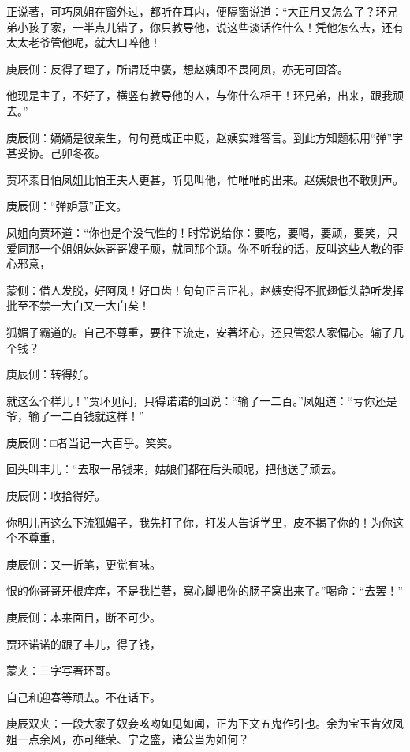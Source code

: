 \begin{parag}
    正说著，可巧凤姐在窗外过，都听在耳内，便隔窗说道：“大正月又怎么了？环兄弟小孩子家，一半点儿错了，你只教导他，说这些淡话作什么！凭他怎么去，还有太太老爷管他呢，就大口啐他！\begin{note}庚辰侧：反得了理了，所谓贬中褒，想赵姨即不畏阿凤，亦无可回答。\end{note}他现是主子，不好了，横竖有教导他的人，与你什么相干！环兄弟，出来，跟我顽去。”\begin{note}庚辰侧：嫡嫡是彼亲生，句句竟成正中贬，赵姨实难答言。到此方知题标用“弹”字甚妥协。己卯冬夜。\end{note}贾环素日怕凤姐比怕王夫人更甚，听见叫他，忙唯唯的出来。赵姨娘也不敢则声。\begin{note}庚辰侧：“弹妒意”正文。\end{note}凤姐向贾环道：“你也是个没气性的！时常说给你：要吃，要喝，要顽，要笑，只爱同那一个姐姐妹妹哥哥嫂子顽，就同那个顽。你不听我的话，反叫这些人教的歪心邪意，\begin{note}蒙侧：借人发脱，好阿凤！好口齿！句句正言正礼，赵姨安得不抿翅低头静听发挥批至不禁一大白又一大白矣！\end{note}狐媚子霸道的。自己不尊重，要往下流走，安著坏心，还只管怨人家偏心。输了几个钱？\begin{note}庚辰侧：转得好。\end{note}就这么个样儿！”贾环见问，只得诺诺的回说：“输了一二百。”凤姐道：“亏你还是爷，输了一二百钱就这样！”\begin{note}庚辰侧：□者当记一大百乎。笑笑。\end{note}回头叫丰儿：“去取一吊钱来，姑娘们都在后头顽呢，把他送了顽去。\begin{note}庚辰侧：收拾得好。\end{note}你明儿再这么下流狐媚子，我先打了你，打发人告诉学里，皮不揭了你的！为你这个不尊重，\begin{note}庚辰侧：又一折笔，更觉有味。\end{note}恨的你哥哥牙根痒痒，不是我拦著，窝心脚把你的肠子窝出来了。”喝命：“去罢！”\begin{note}庚辰侧：本来面目，断不可少。\end{note}贾环诺诺的跟了丰儿，得了钱，\begin{note}蒙夹：三字写著环哥。\end{note}自己和迎春等顽去。不在话下。\begin{note}庚辰双夹：一段大家子奴妾吆吻如见如闻，正为下文五鬼作引也。余为宝玉肯效凤姐一点余风，亦可继荣、宁之盛，诸公当为如何？\end{note}
\end{parag}


